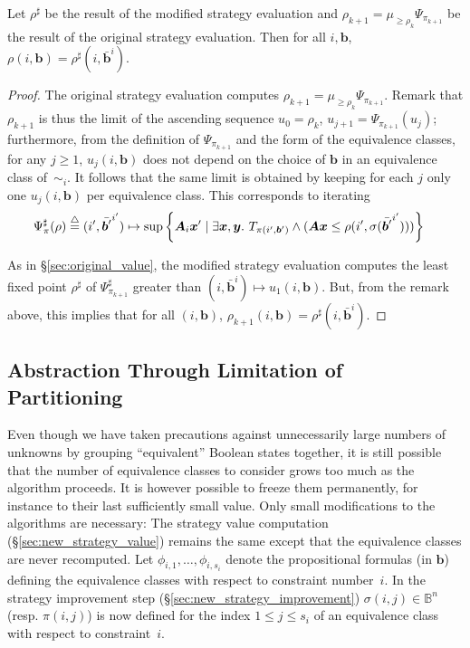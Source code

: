 \documentclass{llncs}
\newcommand{\rronly}[1]{#1}
\newcommand{\BB}{\mathbb{B}}
\newcommand{\eqvclass}[2]{\bar{#1}^{#2}}
\newcommand{\sleq}{\!\leq\!}
\newcommand{\defn}{\stackrel{\triangle}{=}}
\newcommand{\abstr}[1]{#1^\sharp}
\newcommand{\mat}[1]{{\boldsymbol #1}}
\renewcommand{\vec}[1]{{\boldsymbol #1}}
\begin{document}
\begin{theorem}
  Let $\abstr{\rho}$ be the result of the modified strategy evaluation
  and $\rho_{k+1} = \mu_{\geq \rho_k} \Psi_{\pi_{k+1}}$ be the result
  of the original strategy evaluation. Then for all $i,\vec{b}$,
  $\rho(i,\vec{b}) = \abstr{\rho}(i,\eqvclass{\vec{b}}{i})$.
\end{theorem}
\rronly{
\begin{proof}
  The original strategy evaluation computes $\rho_{k+1} = \mu_{\geq \rho_k} \Psi_{\pi_{k+1}}$. Remark that $\rho_{k+1}$ is thus the limit of the ascending sequence $u_0 = \rho_k$, $u_{j+1} = \Psi_{\pi_{k+1}} (u_j)$; furthermore, from the definition of $\Psi_{\pi_{k+1}}$ and the form of the equivalence classes, for any $j \geq 1$, $u_j(i,\vec{b})$ does not depend on the choice of $\vec{b}$ in an equivalence class of~$\sim_i$. It follows that the same limit is obtained by keeping for each $j$ only one $u_j(i,\vec{b})$ per equivalence class. This corresponds to iterating\\[-2ex]
\begin{equation}
\hspace*{-1em}\abstr{\Psi}_{\pi}(\rho) \defn (i',\eqvclass{\vec{b}'}{i'}) \mapsto
  \sup \left\{ \mat{A}_i \vec{x}' \mid \exists \vec{x},\vec{y}.~ T_{\pi(i',\vec{b}')}
          \land (\mat{A}\vec{x} \leq \rho(i',\sigma(\eqvclass{\vec{b}'}{i'}))) \right\}
\end{equation}

As in \S\ref{sec:original_value}, the modified strategy evaluation
computes the least fixed point $\abstr{\rho}$ of
$\abstr{\Psi}_{\pi_{k+1}}$ greater than $(i,\eqvclass{\vec{b}}{i})
\mapsto u_1(i,\vec{b})$. But, from the remark above, this implies that
for all $(i,\vec{b})$, $\rho_{k+1}(i,\vec{b}) =
\abstr{\rho}(i,\eqvclass{\vec{b}}{i})$.
\end{proof}}

\subsection{Abstraction Through Limitation of Partitioning}
Even though we have taken precautions against unnecessarily large
numbers of unknowns by grouping ``equivalent'' Boolean states
together, it is still possible that the number of equivalence classes
to consider grows too much as the algorithm proceeds. 
It is however possible to freeze them
permanently\rronly{, for instance} to their last sufficiently small value.
Only small modifications to the algorithms are necessary: The strategy
value computation (\S\ref{sec:new_strategy_value}) remains the same
except that the equivalence classes are never recomputed. Let
$\phi_{i,1},\dots,\phi_{i,s_i}$ denote the propositional formulas (in
$\vec{b}$) defining the equivalence classes with respect to constraint
number~$i$.  In the strategy improvement step
(\S\ref{sec:new_strategy_improvement}) $\sigma(i,j) \in \BB^n$
(resp. $\pi(i,j)$) is now defined for the index $1 \sleq j \sleq s_i$ of
an equivalence class with respect to constraint~$i$.
\end{document}
